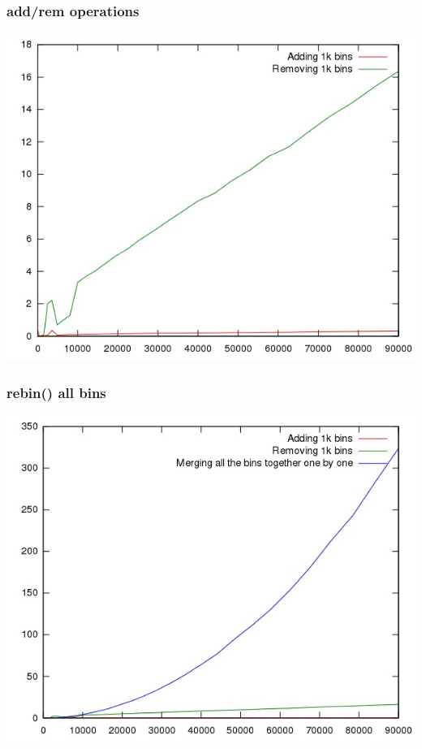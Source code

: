 \documentclass{beamer}
\begin{document}
  \begin{frame}
    \frametitle{add/rem operations}
    \includegraphics[height=0.89\textheight]{2.jpg}
  \end{frame}

  \begin{frame}
    \frametitle{rebin() all bins}
    \includegraphics[height=0.89\textheight]{2a.jpg}
  \end{frame}
\end{document}
